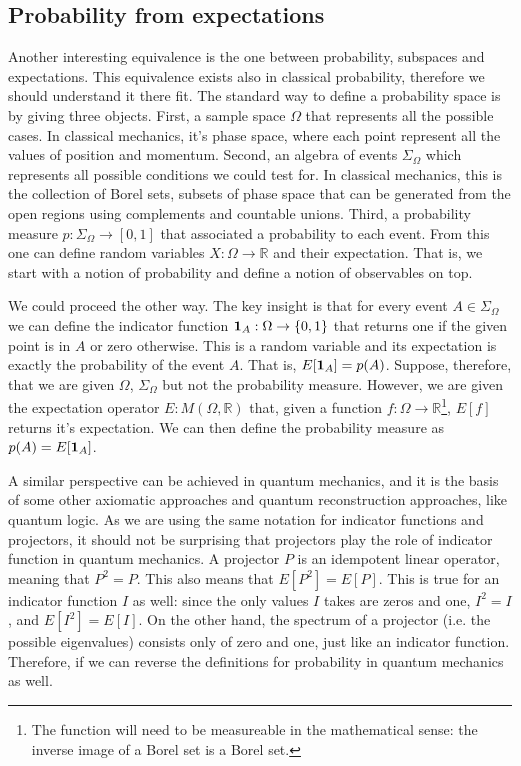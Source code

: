 \subsection{Probability from expectations}

Another interesting equivalence is the one between probability, subspaces and expectations. This equivalence exists also in classical probability, therefore we should understand it there fit. The standard way to define a probability space is by giving three objects. First, a sample space $\Omega$ that represents all the possible cases. In classical mechanics, it's phase space, where each point represent all the values of position and momentum. Second, an algebra of events $\Sigma_{\Omega}$ which represents all possible conditions we could test for. In classical mechanics, this is the collection of Borel sets, subsets of phase space that can be generated from the open regions using complements and countable unions. Third, a probability measure $p : \Sigma_{\Omega} \to [0,1]$ that associated a probability to each event. From this one can define random variables $X : \Omega \to \mathbb{R}$ and their expectation. That is, we start with a notion of probability and define a notion of observables on top.

We could proceed the other way. The key insight is that for every event $A \in \Sigma_{\Omega}$ we can define the indicator function $\indicator[A] : \Omega \to \{0,1\}$ that returns one if the given point is in $A$ or zero otherwise. This is a random variable and its expectation is exactly the probability of the event $A$. That is, $E[\indicator[A]] = p(A)$. Suppose, therefore, that we are given $\Omega$, $\Sigma_{\Omega}$ but not the probability measure. However, we are given the expectation operator $E : M(\Omega, \mathbb{R})$ that, given a function $f : \Omega \to \mathbb{R}$\footnote{The function will need to be measureable in the mathematical sense: the inverse image of a Borel set is a Borel set.}, $E[f]$ returns it's expectation. We can then define the probability measure as $p(A) = E[\indicator[A]]$.

A similar perspective can be achieved in quantum mechanics, and it is the basis of some other axiomatic approaches and quantum reconstruction approaches, like quantum logic. As we are using the same notation for indicator functions and projectors, it should not be surprising that projectors play the role of indicator function in quantum mechanics. A projector $P$ is an idempotent linear operator, meaning that $P^2 = P$. This also means that $E[P^2] = E[P]$. This is true for an indicator function $I$ as well: since the only values $I$ takes are zeros and one, $I^2=I$, and $E[I^2] = E[I]$. On the other hand, the spectrum of a projector (i.e. the possible eigenvalues) consists only of zero and one, just like an indicator function. Therefore, if we can reverse the definitions for probability in quantum mechanics as well.

